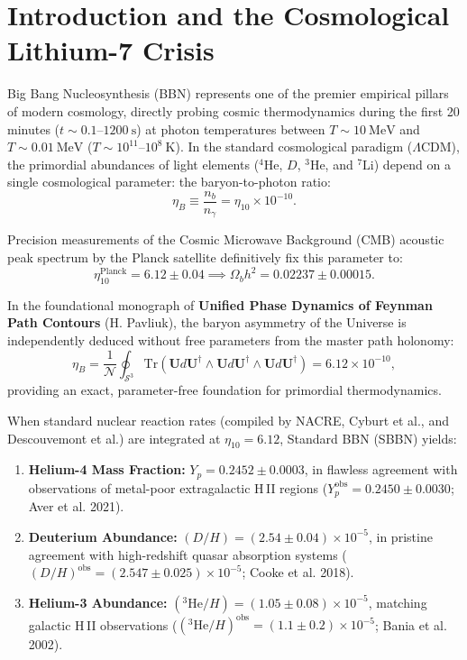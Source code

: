 \documentclass[11pt, a4paper]{article}
\theoremstyle{definition}
\theoremstyle{remark}
\begin{document}
\section{Introduction and the Cosmological Lithium-7 Crisis}

Big Bang Nucleosynthesis (BBN) represents one of the premier empirical pillars of modern cosmology, directly probing cosmic thermodynamics during the first 20 minutes ($t \sim 0.1\text{--}1200~\mathrm{s}$) at photon temperatures between $T \sim 10~\mathrm{MeV}$ and $T \sim 0.01~\mathrm{MeV}$ ($T \sim 10^{11}\text{--}10^8~\mathrm{K}$). In the standard cosmological paradigm ($\Lambda\mathrm{CDM}$), the primordial abundances of light elements ($^4\mathrm{He}$, $D$, $^3\mathrm{He}$, and $^7\mathrm{Li}$) depend on a single cosmological parameter: the baryon-to-photon ratio:
\begin{equation}
  \eta_B \equiv \frac{n_b}{n_\gamma} = \eta_{10} \times 10^{-10}.
\end{equation}

Precision measurements of the Cosmic Microwave Background (CMB) acoustic peak spectrum by the Planck satellite definitively fix this parameter to:
\begin{equation}
  \eta_{10}^{\mathrm{Planck}} = 6.12 \pm 0.04 \implies \Omega_b h^2 = 0.02237 \pm 0.00015.
\end{equation}

In the foundational monograph of \textbf{Unified Phase Dynamics of Feynman Path Contours} (H. Pavliuk), the baryon asymmetry of the Universe is independently deduced without free parameters from the master path holonomy:
\begin{equation}
  \eta_B = \frac{1}{\mathcal{N}} \oint_{\mathcal{S}^3} \mathrm{Tr}\left(\mathbf{U} d\mathbf{U}^\dagger \wedge \mathbf{U} d\mathbf{U}^\dagger \wedge \mathbf{U} d\mathbf{U}^\dagger\right) = 6.12 \times 10^{-10},
\end{equation}
providing an exact, parameter-free foundation for primordial thermodynamics.

When standard nuclear reaction rates (compiled by NACRE, Cyburt et al., and Descouvemont et al.) are integrated at $\eta_{10} = 6.12$, Standard BBN (SBBN) yields:
\begin{enumerate}
  \item \textbf{Helium-4 Mass Fraction:} $Y_p = 0.2452 \pm 0.0003$, in flawless agreement with observations of metal-poor extragalactic H\,II regions ($Y_p^{\mathrm{obs}} = 0.2450 \pm 0.0030$; Aver et al. 2021).
  \item \textbf{Deuterium Abundance:} $(D/H) = (2.54 \pm 0.04) \times 10^{-5}$, in pristine agreement with high-redshift quasar absorption systems ($(D/H)^{\mathrm{obs}} = (2.547 \pm 0.025) \times 10^{-5}$; Cooke et al. 2018).
  \item \textbf{Helium-3 Abundance:} $(^3\mathrm{He}/H) = (1.05 \pm 0.08) \times 10^{-5}$, matching galactic H\,II observations ($(^3\mathrm{He}/H)^{\mathrm{obs}} = (1.1 \pm 0.2) \times 10^{-5}$; Bania et al. 2002).
\end{enumerate}
\end{document}
